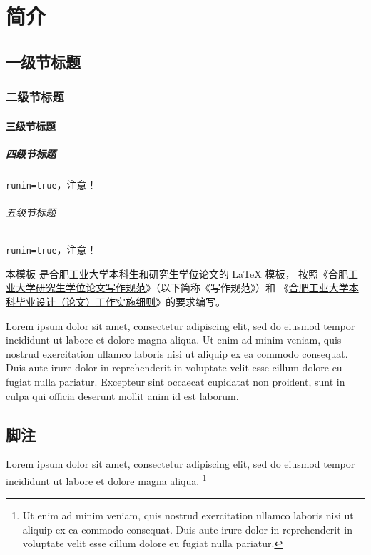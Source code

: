 
\chapter{简介}

\section{一级节标题}

\subsection{二级节标题}

\subsubsection{三级节标题}

\paragraph{四级节标题} \texttt{runin=true}，注意！

\subparagraph{五级节标题} \texttt{runin=true}，注意！

本模板  是合肥工业大学本科生和研究生学位论文的 \LaTeX{}
模板， 按照《\href{http://xwgl.zzu.edu.cn/2021/0419/c1975a253949/page.htm}
{合肥工业大学研究生学位论文写作规范}》（以下简称《写作规范》）和
《\href{http://xcjwb.zzu.edu.cn/53/cc/c1144a21452/page.htm}
{合肥工业大学本科毕业设计（论文）工作实施细则}》的要求编写。

Lorem ipsum dolor sit amet, consectetur adipiscing elit, sed do eiusmod tempor
incididunt ut labore et dolore magna aliqua.
Ut enim ad minim veniam, quis nostrud exercitation ullamco laboris nisi ut
aliquip ex ea commodo consequat.
Duis aute irure dolor in reprehenderit in voluptate velit esse cillum dolore eu
fugiat nulla pariatur.
Excepteur sint occaecat cupidatat non proident, sunt in culpa qui officia
deserunt mollit anim id est laborum.



\section{脚注}

Lorem ipsum dolor sit amet, consectetur adipiscing elit, sed do eiusmod tempor
incididunt ut labore et dolore magna aliqua.
\footnote{Ut enim ad minim veniam, quis nostrud exercitation ullamco laboris
  nisi ut aliquip ex ea commodo consequat.
  Duis aute irure dolor in reprehenderit in voluptate velit esse cillum dolore
  eu fugiat nulla pariatur.}
